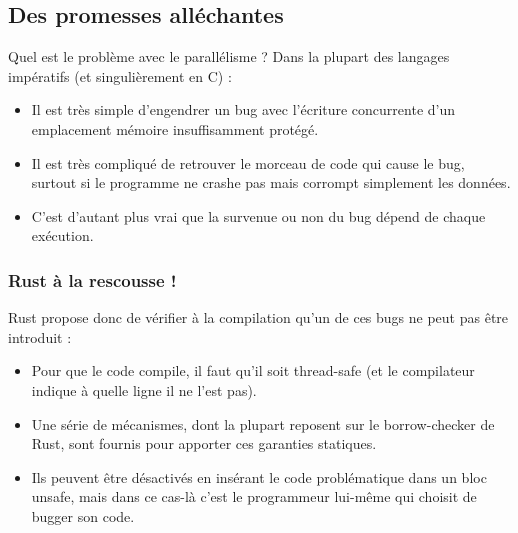 \subsection{Des promesses alléchantes}
\begin{frame}{Quel est le problème avec le parallélisme ?}
  Dans la plupart des langages impératifs (et singulièrement en C) :
  \begin{itemize}
  \item Il est très simple d'engendrer un bug avec l'écriture concurrente d'un emplacement mémoire insuffisamment protégé.
  \item Il est très compliqué de retrouver le morceau de code qui cause le bug, surtout si le programme ne crashe pas mais corrompt simplement les données.
  \item C'est d'autant plus vrai que la survenue ou non du bug dépend de chaque exécution.
  \end{itemize}
\end{frame}

\begin{frame}
  \frametitle{Rust à la rescousse !}
  Rust propose donc de vérifier à la compilation qu'un de ces bugs ne peut pas être introduit :
  \begin{itemize}
  \item Pour que le code compile, il faut qu'il soit thread-safe (et le compilateur indique à quelle ligne il ne l'est pas).
  \item Une série de mécanismes, dont la plupart reposent sur le borrow-checker de Rust, sont fournis pour apporter ces garanties statiques.
  \item Ils peuvent être désactivés en insérant le code problématique dans un bloc unsafe, mais dans ce cas-là c'est le programmeur lui-même qui choisit de bugger son code.
  \end{itemize}
\end{frame}

